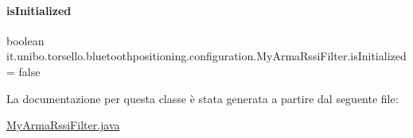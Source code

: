 \paragraph{\texorpdfstring{is\+Initialized}{isInitialized}}
{\footnotesize\ttfamily boolean it.\+unibo.\+torsello.\+bluetoothpositioning.\+configuration.\+My\+Arma\+Rssi\+Filter.\+is\+Initialized = false\hspace{0.3cm}{\ttfamily [private]}}



La documentazione per questa classe è stata generata a partire dal seguente file\+:\begin{DoxyCompactItemize}
\item 
\hyperlink{MyArmaRssiFilter_8java}{My\+Arma\+Rssi\+Filter.\+java}\end{DoxyCompactItemize}
